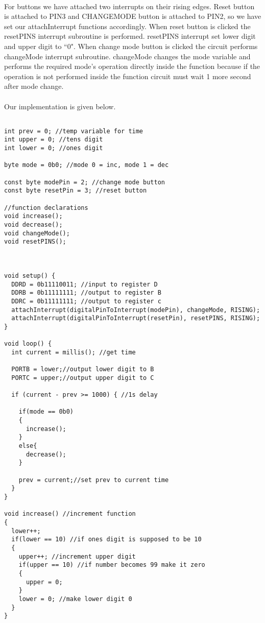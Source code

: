 \documentclass[pdftex,12pt,a4paper]{article}
\begin{document}
\begin{flushleft}
\paragraph{}
For buttons we have attached two interrupts on their rising edges. Reset button is attached to PIN3 and CHANGEMODE button is attached to PIN2, so we have set our attachInterrupt functions accordingly. When reset button is clicked the resetPINS interrupt subroutine is performed. resetPINS interrupt set lower digit and upper digit to ``0". When change mode button is clicked the circuit performs changeMode interrupt subroutine. changeMode changes the mode variable and performs the required mode's operation directly inside the function because if the operation is not performed inside the function circuit must wait 1 more second after mode change.
\paragraph{}
Our implementation is given below.
\begin{lstlisting}[style={Arduino}]

int prev = 0; //temp variable for time
int upper = 0; //tens digit
int lower = 0; //ones digit

byte mode = 0b0; //mode 0 = inc, mode 1 = dec

const byte modePin = 2; //change mode button
const byte resetPin = 3; //reset button

//function declarations
void increase();
void decrease();
void changeMode();
void resetPINS();



void setup() {
  DDRD = 0b11110011; //input to register D
  DDRB = 0b11111111; //output to register B
  DDRC = 0b11111111; //output to register c
  attachInterrupt(digitalPinToInterrupt(modePin), changeMode, RISING);
  attachInterrupt(digitalPinToInterrupt(resetPin), resetPINS, RISING);
}

void loop() {
  int current = millis(); //get time
  
  PORTB = lower;//output lower digit to B
  PORTC = upper;//output upper digit to C
  
  if (current - prev >= 1000) { //1s delay

    if(mode == 0b0)
    {
      increase();
    }
    else{
      decrease();
    }
    
    prev = current;//set prev to current time
  }
}

void increase() //increment function
{
  lower++;
  if(lower == 10) //if ones digit is supposed to be 10
  {
    upper++; //increment upper digit
   	if(upper == 10) //if number becomes 99 make it zero
    {
      upper = 0;
    }
    lower = 0; //make lower digit 0
  }
}


\end{lstlisting}
\end{flushleft}
\end{document}
